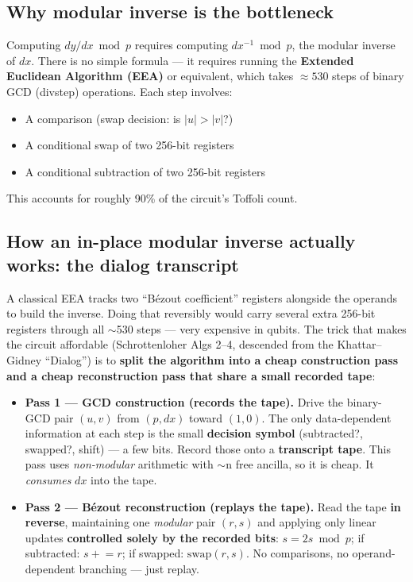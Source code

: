 \documentclass[11pt,a4paper]{article}
\newcommand{\tof}{Toffoli\xspace}
\begin{document}
\subsection{Why modular inverse is the bottleneck}

Computing $dy/dx \bmod p$ requires computing $dx^{-1} \bmod p$, the modular inverse of $dx$.
There is no simple formula --- it requires running the \textbf{Extended Euclidean Algorithm (EEA)}
or equivalent, which takes $\approx530$ steps of binary GCD (divstep) operations. Each step involves:
\begin{itemize}
  \item A comparison (swap decision: is $|u| > |v|$?)
  \item A conditional swap of two 256-bit registers
  \item A conditional subtraction of two 256-bit registers
\end{itemize}
This accounts for roughly 90\% of the circuit's \tof count.

\subsection{How an in-place modular inverse actually works: the dialog transcript}
\label{sec:dialog}

A classical EEA tracks two ``B\'ezout coefficient'' registers alongside the operands to build the
inverse. Doing that reversibly would carry several extra 256-bit registers through all $\sim$530
steps --- very expensive in qubits. The trick that makes the circuit affordable (Schrottenloher
Algs 2--4, descended from the Khattar--Gidney ``Dialog'') is to \textbf{split the algorithm into a
cheap construction pass and a cheap reconstruction pass that share a small recorded tape}:
\begin{itemize}
  \item \textbf{Pass 1 --- GCD construction (records the tape).} Drive the binary-GCD pair $(u, v)$
    from $(p, dx)$ toward $(1, 0)$. The only data-dependent information at each step is the small
    \textbf{decision symbol} (subtracted?, swapped?, shift) --- a few bits. Record those onto a
    \textbf{transcript tape}. This pass uses \emph{non-modular} arithmetic with $\sim$n free ancilla,
    so it is cheap. It \emph{consumes} $dx$ into the tape.
  \item \textbf{Pass 2 --- B\'ezout reconstruction (replays the tape).} Read the tape \textbf{in
    reverse}, maintaining one \emph{modular} pair $(r, s)$ and applying only linear updates
    \textbf{controlled solely by the recorded bits}: $s = 2s \bmod p$; if subtracted: $s \mathrel{+}= r$;
    if swapped: $\mathrm{swap}(r,s)$. No comparisons, no operand-dependent branching --- just replay.
\end{itemize}
\end{document}
